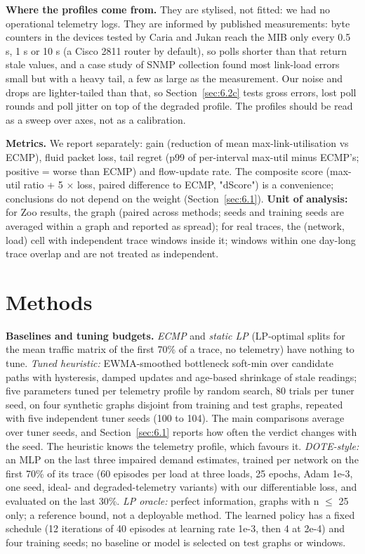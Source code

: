 \documentclass[journal]{IEEEtran}
\begin{document}
\textbf{Where the profiles come from.} They are stylised, not fitted: we had no operational telemetry logs. They are informed by published measurements: byte counters in the devices tested by Caria and Jukan \cite{r21} reach the MIB only every 0.5 s, 1 s or 10 s (a Cisco 2811 router by default), so polls shorter than that return stale values, and a case study of SNMP collection \cite{r22} found most link-load errors small but with a heavy tail, a few as large as the measurement. Our noise and drops are lighter-tailed than that, so Section~\ref{sec:6.2c} tests gross errors, lost poll rounds and poll jitter on top of the degraded profile. The profiles should be read as a sweep over axes, not as a calibration.

\textbf{Metrics.} We report separately: gain (reduction of mean max-link-utilisation vs ECMP), fluid packet loss, tail regret (p99 of per-interval max-util minus ECMP's; positive = worse than ECMP) and flow-update rate. The composite score (max-util ratio + 5 $\times$ loss, paired difference to ECMP, "dScore") is a convenience; conclusions do not depend on the weight (Section~\ref{sec:6.1}). \textbf{Unit of analysis:} for Zoo results, the graph (paired across methods; seeds and training seeds are averaged within a graph and reported as spread); for real traces, the (network, load) cell with independent trace windows inside it; windows within one day-long trace overlap and are not treated as independent.

\section{Methods}
\label{sec:4}
\textbf{Baselines and tuning budgets.} \textit{ECMP} and \textit{static LP} (LP-optimal splits for the mean traffic matrix of the first 70\% of a trace, no telemetry) have nothing to tune. \textit{Tuned heuristic:} EWMA-smoothed bottleneck soft-min over candidate paths with hysteresis, damped updates and age-based shrinkage of stale readings; five parameters tuned per telemetry profile by random search, 80 trials per tuner seed, on four synthetic graphs disjoint from training and test graphs, repeated with five independent tuner seeds (100 to 104). The main comparisons average over tuner seeds, and Section~\ref{sec:6.1} reports how often the verdict changes with the seed. The heuristic knows the telemetry profile, which favours it. \textit{DOTE-style:} an MLP on the last three impaired demand estimates, trained per network on the first 70\% of its trace (60 episodes per load at three loads, 25 epochs, Adam 1e-3, one seed, ideal- and degraded-telemetry variants) with our differentiable loss, and evaluated on the last 30\%. \textit{LP oracle:} perfect information, graphs with n $\le$ 25 only; a reference bound, not a deployable method. The learned policy has a fixed schedule (12 iterations of 40 episodes at learning rate 1e-3, then 4 at 2e-4) and four training seeds; no baseline or model is selected on test graphs or windows.
\end{document}
